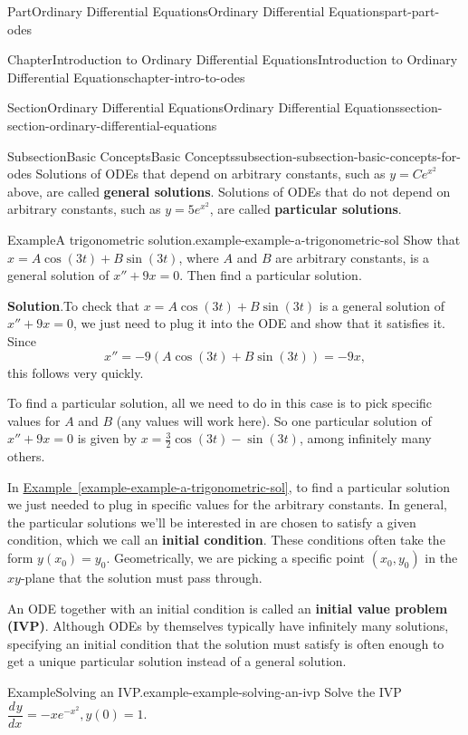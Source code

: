 \documentclass[twoside,10pt,]{book}
\newcommand{\blocktitlefont}{\relax}
\newcommand{\xreffont}{\relax}
\newcommand{\terminology}[1]{\textbf{#1}}
\numberwithin{equation}{part}
\newcommand{\dv}[3][]{\dfrac{d^{#1} #2}{d #3^{#1}}}
\begin{document}
\begin{partptx}{Part}{Ordinary Differential Equations}{}{Ordinary Differential Equations}{}{}{part-part-odes}
\begin{chapterptx}{Chapter}{Introduction to Ordinary Differential Equations}{}{Introduction to Ordinary Differential Equations}{}{}{chapter-intro-to-odes}
\begin{sectionptx}{Section}{Ordinary Differential Equations}{}{Ordinary Differential Equations}{}{}{section-section-ordinary-differential-equations}
\begin{subsectionptx}{Subsection}{Basic Concepts}{}{Basic Concepts}{}{}{subsection-subsection-basic-concepts-for-odes}
Solutions of ODEs that depend on arbitrary constants, such as \(y = Ce^{x^{2}}\) above, are called \terminology{general solutions}. Solutions of ODEs that do not depend on arbitrary constants, such as \(y = 5e^{x^{2}}\), are called \terminology{particular solutions}.%
\begin{example}{Example}{A trigonometric solution.}{example-example-a-trigonometric-sol}%
Show that \(x = A\cos(3t) + B\sin(3t)\), where \(A\) and \(B\) are arbitrary constants, is a general solution of \(x'' + 9x = 0\). Then find a particular solution.%
\par\smallskip%
\noindent\textbf{\blocktitlefont Solution}.\hypertarget{solution-example-a-trigonometric-sol-c}{}\quad{}To check that \(x = A\cos(3t) + B\sin(3t)\) is a general solution of \(x''+9x = 0\), we just need to plug it into the ODE and show that it satisfies it. Since%
\begin{equation*}
x'' = -9(A\cos(3t)+B\sin(3t)) = -9x,
\end{equation*}
this follows very quickly.%
\par
To find a particular solution, all we need to do in this case is to pick specific values for \(A\) and \(B\) (any values will work here). So one particular solution of \(x''+9x = 0\) is given by \(x = \frac{3}{2}\cos(3t) - \sin(3t)\), among infinitely many others.%
\end{example}
In \hyperref[example-example-a-trigonometric-sol]{Example~{\xreffont\ref{example-example-a-trigonometric-sol}}}, to find a particular solution we just needed to plug in specific values for the arbitrary constants. In general, the particular solutions we'll be interested in are chosen to satisfy a given condition, which we call an \terminology{initial condition}. These conditions often take the form \(y(x_{0}) = y_{0}\). Geometrically, we are picking a specific point \((x_{0},y_{0})\) in the \(xy\)-plane that the solution must pass through.%
\par
An ODE together with an initial condition is called an \terminology{initial value problem (IVP)}. Although ODEs by themselves typically have infinitely many solutions, specifying an initial condition that the solution must satisfy is often enough to get a unique particular solution instead of a general solution.%
\begin{example}{Example}{Solving an IVP.}{example-example-solving-an-ivp}%
Solve the IVP \(\dv{y}{x} = -xe^{-x^{2}}, y(0)=1\).%
\par\smallskip%

\end{example}
\end{subsectionptx}
\end{sectionptx}
\end{chapterptx}
\end{partptx}
\end{document}
